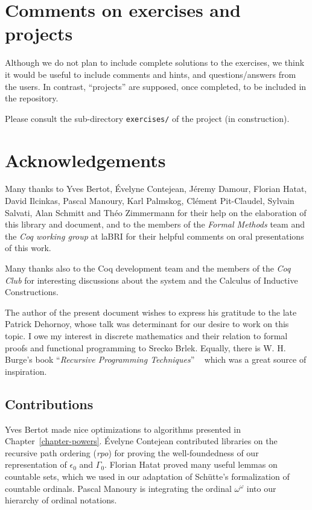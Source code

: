 \documentclass[twoside,a4paper]{book}
\begin{document}
\section{Comments on exercises and projects}

Although we do not plan to include complete solutions to the exercises, 
we think it would be useful to include comments and hints, and questions/answers from the users. In contrast, ``projects'' are supposed, once completed, to be included in the repository.

Please consult the sub-directory \texttt{exercises/} of the
 project (in construction).

\section{Acknowledgements}
\label{sec:orgheadline5}
    Many thanks to Yves Bertot, \'Evelyne Contejean, Jéremy Damour,   Florian Hatat,  David Ilcinkas, 
Pascal Manoury,  Karl Palmskog, Cl\'ement Pit-Claudel, Sylvain Salvati, Alan Schmitt and Théo Zimmermann for their help on the elaboration of this library and  document, and to the
 members of the \emph{Formal Methods} team and the \emph{Coq working group} at laBRI for their helpful comments 
on  oral presentations of this work. 

Many thanks also to the Coq development team and the members of the \emph{Coq Club} for interesting discussions about the \coq{} system and the Calculus of Inductive Constructions.

The author of the present document wishes to express his gratitude to the late Patrick Dehornoy, whose talk  was determinant for our desire to work on this topic.
I owe my interest in discrete mathematics and their relation to formal proofs and functional programming  to Srecko Brlek.  Equally, there is W. H. Burge's book ``\emph{Recursive Programming Techniques}'' ~\cite{burge} which was a great  source of inspiration.



\subsection{Contributions}

Yves Bertot made nice optimizations  to algorithms presented in Chapter~\ref{chapter-powers}.
\'Evelyne Contejean contributed libraries on the recursive path ordering (\emph{rpo}) for proving the well-foundedness of our representation of $\epsilon_0$ and $\Gamma_0$.
Florian Hatat proved many useful lemmas on countable sets, which we used in our adaptation of Schütte's formalization of countable ordinals. Pascal Manoury is integrating the ordinal $\omega^\omega$ into our hierarchy of ordinal notations.
\end{document}
